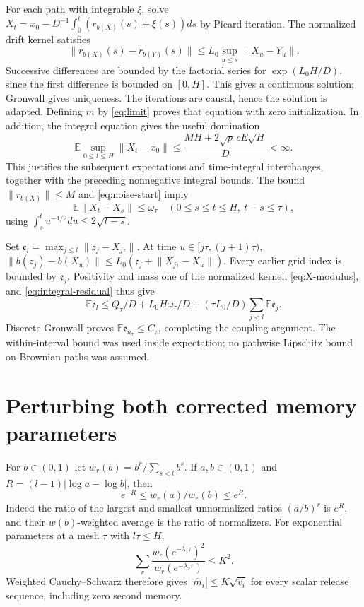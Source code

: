 \documentclass[a4paper,11pt]{article}
\theoremstyle{remark}
\newcommand{\E}{\mathbb E}
\newcommand{\norm}[1]{\lVert#1\rVert}
\begin{document}
For each path with integrable $\xi$, solve
$X_t=x_0-D^{-1}\int_0^t(r_{b(X)}(s)+\xi(s))ds$ by Picard iteration.
The normalized drift kernel satisfies
\[
 \norm{r_{b(X)}(s)-r_{b(Y)}(s)}
       \le L_0\sup_{u\le s}\norm{X_u-Y_u}.
\]
Successive differences are bounded by the factorial series for
$\exp(L_0H/D)$, since the first difference is bounded on $[0,H]$.
This gives a continuous solution; Gronwall gives uniqueness. The iterations
are causal, hence the solution is adapted. Defining $m$ by
\eqref{eq:limit} proves that equation with zero initialization.
In addition, the integral equation gives the useful domination
\[
 \E\sup_{0\le t\le H}\norm{X_t-x_0}
 \le \frac{MH+2\sqrt p\,cE\sqrt H}{D}<\infty.
\]
This justifies the subsequent expectations and time-integral interchanges,
together with the preceding nonnegative integral bounds.
The bound $\norm{r_{b(X)}}\le M$ and \eqref{eq:noise-start} imply
\begin{equation}\label{eq:X-modulus}
 \E\norm{X_t-X_s}\le\omega_\tau\quad(0\le s\le t\le H,\ t-s\le\tau),
\end{equation}
using $\int_s^t u^{-1/2}du\le2\sqrt{t-s}$.

Set $\mathfrak e_l=\max_{j\le l}\norm{z_j-X_{j\tau}}$. At time
$u\in[j\tau,(j+1)\tau)$,
$\norm{b(z_j)-b(X_u)}\le L_0(\mathfrak e_j+\norm{X_{j\tau}-X_u})$.
Every earlier grid index is bounded by $\mathfrak e_j$. Positivity and mass one of
the normalized kernel, \eqref{eq:X-modulus}, and
\eqref{eq:integral-residual} thus give
\[
 \E \mathfrak e_l\le Q_\tau/D+L_0H\omega_\tau/D
               +(\tau L_0/D)\sum_{j<l}\E \mathfrak e_j.
\]
Discrete Gronwall proves $\E \mathfrak e_{n_\tau}\le C_\tau$, completing the
coupling argument. The within-interval bound was used inside expectation;
no pathwise Lipschitz bound on Brownian paths was assumed.

\section{Perturbing both corrected memory parameters}\label{app:memory}

For $b\in(0,1)$ let $w_r(b)=b^r/\sum_{s<l}b^s$.
If $a,b\in(0,1)$ and $R=(l-1)|\log a-\log b|$, then
\begin{equation}\label{eq:relative-weights}
 e^{-R}\le w_r(a)/w_r(b)\le e^R.
\end{equation}
Indeed the ratio of the largest and smallest unnormalized ratios $(a/b)^r$
is $e^R$, and their $w(b)$-weighted average is the ratio of normalizers.
For exponential parameters at a mesh $\tau$ with $l\tau\le H$,
\[
 \sum_r\frac{w_r(e^{-\lambda_1\tau})^2}
                {w_r(e^{-\lambda_2\tau})}\le K^2.
\]
Weighted Cauchy--Schwarz therefore gives $|\widehat m_i|\le K\sqrt{\widehat v_i}$
for every scalar release sequence, including zero second memory.
\end{document}
